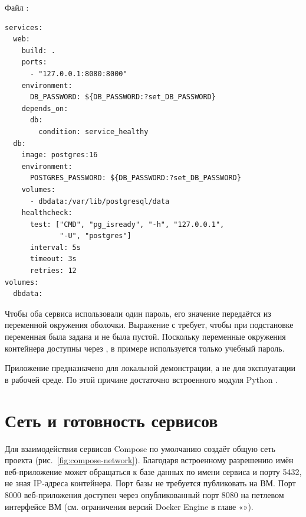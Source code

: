\par\addvspace{10pt}\noindent\begin{minipage}{\linewidth}
\setlength{\parindent}{0pt}\noindent\hspace*{1.25cm}Файл :\par\kern 10pt
\begin{verbatim}
services:
  web:
    build: .
    ports:
      - "127.0.0.1:8080:8000"
    environment:
      DB_PASSWORD: ${DB_PASSWORD:?set_DB_PASSWORD}
    depends_on:
      db:
        condition: service_healthy
  db:
    image: postgres:16
    environment:
      POSTGRES_PASSWORD: ${DB_PASSWORD:?set_DB_PASSWORD}
    volumes:
      - dbdata:/var/lib/postgresql/data
    healthcheck:
      test: ["CMD", "pg_isready", "-h", "127.0.0.1",
             "-U", "postgres"]
      interval: 5s
      timeout: 3s
      retries: 12
volumes:
  dbdata:
\end{verbatim}
\end{minipage}\par\addvspace{10pt}

Чтобы оба сервиса использовали один пароль, его значение передаётся из переменной окружения оболочки. Выражение с  требует, чтобы при подстановке переменная была задана и не была пустой. Поскольку переменные окружения контейнера доступны через , в примере используется только учебный пароль.

Приложение предназначено для локальной демонстрации, а не для эксплуатации в рабочей среде. По этой причине достаточно встроенного модуля Python .

\section{Сеть и готовность сервисов}

Для взаимодействия сервисов Compose по умолчанию создаёт общую сеть проекта (рис.~\ref*{fig:compose-network}). Благодаря встроенному разрешению имён веб-приложение может обращаться к базе данных по имени сервиса  и порту 5432, не зная IP-адреса контейнера. Порт базы не требуется публиковать на ВМ. Порт 8000 веб-приложения доступен через опубликованный порт 8080 на петлевом интерфейсе ВМ (см. ограничения версий Docker Engine в главе «»).

